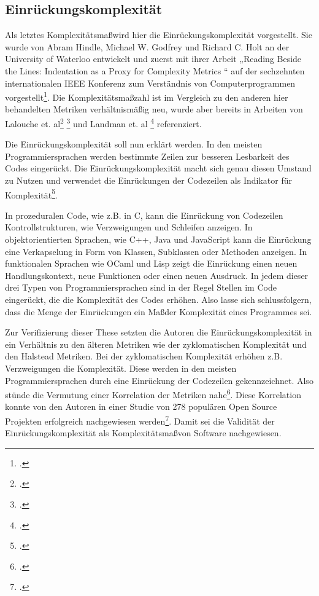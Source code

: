 \subsection{Einrückungskomplexität}\label{Einruckungskomplexitat}

Als letztes Komplexitätsma\ss  wird hier die Einrückungskomplexität
vorgestellt. Sie wurde von Abram Hindle, Michael W. Godfrey und Richard
C. Holt an der University of Waterloo entwickelt und zuerst mit ihrer
Arbeit „Reading Beside the Lines: Indentation as a Proxy for Complexity
Metrics `` auf der sechzehnten internationalen IEEE Konferenz zum
Verständnis von Computerprogrammen vorgestellt\footcite[Vgl. ][S. 1]{hindleReadingLinesIndentation2008}. Die Komplexitätsma\ss zahl ist im Vergleich zu den anderen hier
behandelten Metriken verhältnismä\ss ig neu, wurde aber bereits in Arbeiten
von Lalouche et. al\footcite[Vgl. ][S. 10]{gilWhenSoftwareComplexity2016}
\footcite[Vgl. ][S. 7]{gilCorrelationSizeMetric2017} und Landman et. al
\footcite[Vgl. ][S. 6]{landmanEmpiricalAnalysisRelationship2016} referenziert.

Die Einrückungskomplexität soll nun erklärt werden. In den meisten
Programmiersprachen werden bestimmte Zeilen zur besseren Lesbarkeit des
Codes eingerückt. Die Einrückungskomplexität macht sich genau diesen
Umstand zu Nutzen und verwendet die Einrückungen der Codezeilen als
Indikator für Komplexität\footcite[Vgl. ][S. 1]{hindleReadingLinesUsing2009}.

In prozeduralen Code, wie z.B. in C, kann die Einrückung von Codezeilen
Kontrollstrukturen, wie Verzweigungen und Schleifen anzeigen. In
objektorientierten Sprachen, wie C++, Java und JavaScript kann die
Einrückung eine Verkapselung in Form von Klassen, Subklassen oder
Methoden anzeigen. In funktionalen Sprachen wie OCaml und Lisp zeigt die
Einrückung einen neuen Handlungskontext, neue Funktionen oder einen
neuen Ausdruck. In jedem dieser drei Typen von
Programmiersprachen sind in der Regel Stellen im Code eingerückt, die
die Komplexität des Codes erhöhen. Also lasse sich schlussfolgern, dass
die Menge der Einrückungen ein Ma\ss  der Komplexität eines Programmes sei.

Zur Verifizierung dieser These setzten die Autoren die
Einrückungskomplexität in ein Verhältnis zu den älteren Metriken wie der
zyklomatischen Komplexität und den Halstead Metriken. Bei der
zyklomatischen Komplexität erhöhen z.B. Verzweigungen die Komplexität.
Diese werden in den meisten Programmiersprachen durch eine Einrückung
der Codezeilen gekennzeichnet. Also stünde die Vermutung einer
Korrelation der Metriken nahe\footcite[Vgl. ][S. 2]{hindleReadingLinesUsing2009}.
Diese Korrelation konnte von den Autoren in einer Studie von 278
populären Open Source Projekten erfolgreich nachgewiesen
werden\footcite[][]{hindleReadingLinesUsing2009}. Damit sei die Validität der
Einrückungskomplexität als Komplexitätsma\ss  von Software nachgewiesen.

